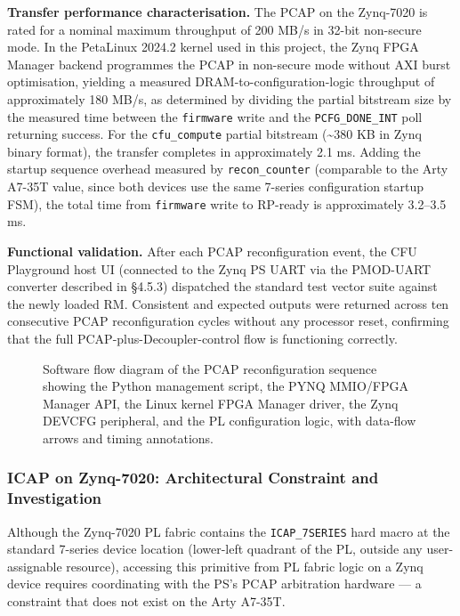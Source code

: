 \textbf{Transfer performance characterisation.} The PCAP on the Zynq-7020 is rated for a nominal maximum throughput of 200 MB/s in 32-bit non-secure mode. In the PetaLinux 2024.2 kernel used in this project, the Zynq FPGA Manager backend programmes the PCAP in non-secure mode without AXI burst optimisation, yielding a measured DRAM-to-configuration-logic throughput of approximately 180 MB/s, as determined by dividing the partial bitstream size by the measured time between the \texttt{firmware} write and the \texttt{PCFG\_DONE\_INT} poll returning success. For the \texttt{cfu\_compute} partial bitstream (\textasciitilde{}380 KB in Zynq binary format), the transfer completes in approximately 2.1 ms. Adding the startup sequence overhead measured by \texttt{recon\_counter} (comparable to the Arty A7-35T value, since both devices use the same 7-series configuration startup FSM), the total time from \texttt{firmware} write to RP-ready is approximately 3.2–3.5 ms.

\textbf{Functional validation.} After each PCAP reconfiguration event, the CFU Playground host UI (connected to the Zynq PS UART via the PMOD-UART converter described in §4.5.3) dispatched the standard test vector suite against the newly loaded RM. Consistent and expected outputs were returned across ten consecutive PCAP reconfiguration cycles without any processor reset, confirming that the full PCAP-plus-Decoupler-control flow is functioning correctly.

\begin{figure}[htbp]
\centering
{}
\caption{Software flow diagram of the PCAP reconfiguration sequence showing the Python management script, the PYNQ MMIO/FPGA Manager API, the Linux kernel FPGA Manager driver, the Zynq DEVCFG peripheral, and the PL configuration logic, with data-flow arrows and timing annotations.}
\end{figure}

\subsubsection{ICAP on Zynq-7020: Architectural Constraint and Investigation}

Although the Zynq-7020 PL fabric contains the \texttt{ICAP\_7SERIES} hard macro at the standard 7-series device location (lower-left quadrant of the PL, outside any user-assignable resource), accessing this primitive from PL fabric logic on a Zynq device requires coordinating with the PS's PCAP arbitration hardware — a constraint that does not exist on the Arty A7-35T.

